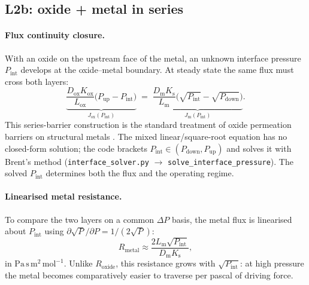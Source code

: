 \documentclass[11pt,a4paper]{article}
\newcommand{\Pup}{P_{\mathrm{up}}}
\newcommand{\Pdown}{P_{\mathrm{down}}}
\newcommand{\Pint}{P_{\mathrm{int}}}
\newcommand{\Ks}{K_{\mathrm{s}}}
\newcommand{\Kox}{K_{\mathrm{ox}}}
\newcommand{\Dm}{D_{\mathrm{m}}}
\newcommand{\Dox}{D_{\mathrm{ox}}}
\newcommand{\Lm}{L_{\mathrm{m}}}
\newcommand{\Lox}{L_{\mathrm{ox}}}
\newcommand{\Rox}{R_{\mathrm{oxide}}}
\newcommand{\Rmet}{R_{\mathrm{metal}}}
\newcommand{\code}[1]{\texttt{#1}}
\begin{document}
\subsection{L2b: oxide + metal in series}

\paragraph{Flux continuity closure.} With an oxide on the upstream face of the
metal, an unknown interface pressure $\Pint$ develops at the oxide--metal
boundary. At steady state the same flux must cross both layers:
\begin{equation}
  \underbrace{\frac{\Dox\Kox}{\Lox}\bigl(\Pup - \Pint\bigr)}_{J_{\mathrm{ox}}(\Pint)}
  \;=\;
  \underbrace{\frac{\Dm\Ks}{\Lm}\bigl(\sqrt{\Pint} - \sqrt{\Pdown}\bigr)}_{J_{\mathrm{m}}(\Pint)} .
  \label{eq:closureL2b}
\end{equation}
This series-barrier construction is the standard treatment of oxide permeation
barriers on structural metals \citep{strehlow1974,hollenberg1995}. The mixed
linear/square-root equation has no closed-form solution; the code
brackets $\Pint \in (\Pdown, \Pup)$ and solves it with Brent's method
(\code{interface\_solver.py} $\rightarrow$ \code{solve\_interface\_pressure}).
The solved $\Pint$ determines both the flux and the operating regime.

\paragraph{Linearised metal resistance.} To compare the two layers on a common
$\Delta P$ basis, the metal flux is linearised about $\Pint$ using
$\partial\sqrt{P}/\partial P = 1/(2\sqrt{P})$:
\begin{equation}
  \Rmet \approx \frac{2 \Lm \sqrt{\Pint}}{\Dm \Ks},
  \label{eq:Rmetal}
\end{equation}
in $\mathrm{Pa\,s\,m^{2}\,mol^{-1}}$. Unlike $\Rox$, this resistance grows
with $\sqrt{\Pint}$: at high pressure the metal becomes comparatively easier
to traverse per pascal of driving force.
\end{document}

